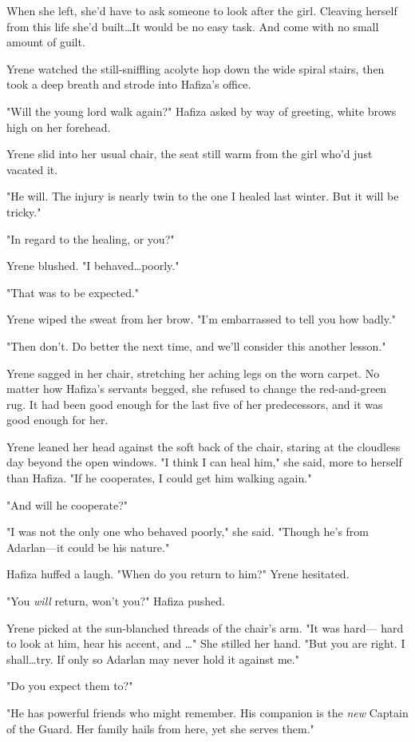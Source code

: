 When she left, she'd have to ask someone to look after the girl. Cleaving herself from this life she'd built\ldots It would be no easy task. And come with no small amount of guilt.

Yrene watched the still-sniffling acolyte hop down the wide spiral stairs, then took a deep breath and strode into Hafiza's office.

"Will the young lord walk again?" Hafiza asked by way of greeting, white brows high on her forehead.

Yrene slid into her usual chair, the seat still warm from the girl who'd just vacated it.

"He will. The injury is nearly twin to the one I healed last winter. But it will be tricky."

"In regard to the healing, or you?"

Yrene blushed. "I behaved\ldots poorly."

"That was to be expected."

Yrene wiped the sweat from her brow. "I'm embarrassed to tell you how badly."

"Then don't. Do better the next time, and we'll consider this another lesson."

Yrene sagged in her chair, stretching her aching legs on the worn carpet. No matter how Hafiza's servants begged, she refused to change the red-and-green rug. It had been good enough for the last five of her predecessors, and it was good enough for her.

Yrene leaned her head against the soft back of the chair, staring at the cloudless day beyond the open windows. "I think I can heal him," she said, more to herself than Hafiza. "If he cooperates, I could get him walking again."

"And will he cooperate?"

"I was not the only one who behaved poorly," she said. "Though he's from Adarlan---it could be his nature."

Hafiza huffed a laugh. "When do you return to him?" Yrene hesitated.

"You \emph{will} return, won't you?" Hafiza pushed.

Yrene picked at the sun-blanched threads of the chair's arm. "It was hard--- hard to look at him, hear his accent, and \ldots" She stilled her hand. "But you are right. I shall\ldots try. If only so Adarlan may never hold it against me."

"Do you expect them to?"

"He has powerful friends who might remember. His companion is the \emph{new} Captain of the Guard. Her family hails from here, yet she serves them."

